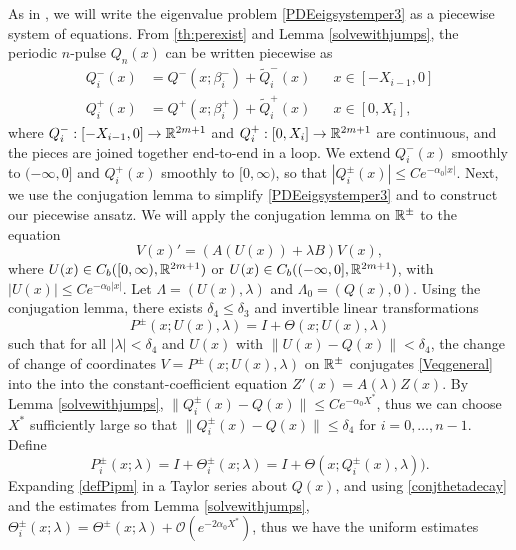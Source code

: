 \documentclass[10pt,reqno]{amsart}
\theoremstyle{plain}
\theoremstyle{definition}
\theoremstyle{remark}
\numberwithin{theorem}{section}
\numberwithin{equation}{section}
\begin{document}
As in \cite{Sandstede1998}, we will write the eigenvalue problem \cref{PDEeigsystemper3} as a piecewise system of equations. From \cref{th:perexist} and Lemma \ref{solvewithjumps}, the periodic $n$-pulse $Q_n(x)$ can be written piecewise as
\begin{equation}\label{Qnppiece}
\begin{aligned}
Q_i^-(x) &= Q^-(x; \beta_i^-) + \tilde{Q}_i^-(x) && x \in [-X_{i-1}, 0] \\
Q_i^+(x) &= Q^+(x; \beta_i^+) + \tilde{Q}_i^+(x) && x \in [0, X_i],
\end{aligned}
\end{equation}
where $Q_i^-: [-X_{i-1}, 0] \rightarrow \mathbb{R}^{2m+1}$ and $Q_i^+: [0, X_i] \rightarrow \mathbb{R}^{2m+1}$ are continuous, and the pieces are joined together end-to-end in a loop. We extend $Q_i^-(x)$ smoothly to $(-\infty, 0]$ and $Q_i^+(x)$ smoothly to $[0, \infty)$, so that $|Q_i^\pm(x)| \leq C e^{-\alpha_0 |x|}$. Next, we use the conjugation lemma to simplify \cref{PDEeigsystemper3} and to construct our piecewise ansatz. We will apply the conjugation lemma on $\mathbb{R}^\pm$ to the equation
\begin{equation}\label{Veqgeneral}
V(x)' = ( A(U(x)) + \lambda B)  V(x),
\end{equation}
where $U(x) \in C_b([0, \infty), \mathbb{R}^{2m+1})$ or $U(x) \in C_b((-\infty, 0], \mathbb{R}^{2m+1})$, with $|U(x)| \leq C e^{-\alpha_0 |x|}$. Let $\Lambda = (U(x), \lambda)$ and $\Lambda_0 = (Q(x), 0)$. Using the conjugation lemma, there exists $\delta_4 \leq \delta_3$ and invertible linear transformations
\[
P^\pm(x; U(x), \lambda) = I + \Theta(x; U(x), \lambda)
\]
such that for all $|\lambda| < \delta_4$ and $U(x)$ with $\| U(x) - Q(x) \| < \delta_4$, the change of change of coordinates $V = P^\pm(x; U(x), \lambda)$ on $\mathbb{R}^\pm$ conjugates \cref{Veqgeneral} into the into the constant-coefficient equation $Z'(x) = A(\lambda) Z(x)$. By Lemma \ref{solvewithjumps}, $\| Q_i^\pm(x) - Q(x) \| \leq C e^{-\alpha_0 X^*}$, thus we can choose $X^*$ sufficiently large so that $\| Q_i^\pm(x) - Q(x) \| \leq \delta_4$ for $i = 0, \dots, n-1$. Define
\begin{equation}\label{defPipm}
P_i^\pm(x; \lambda) = I + \Theta_i^\pm(x; \lambda) = I + \Theta(x; Q_i^\pm(x), \lambda)).
\end{equation}
Expanding \cref{defPipm} in a Taylor series about $Q(x)$, and using \cref{conjthetadecay} and the estimates from Lemma \ref{solvewithjumps}, $\Theta_i^\pm(x; \lambda) = \Theta^\pm(x; \lambda) + \mathcal{O}(e^{-2 \alpha_0 X^*})$, thus we have the uniform estimates
\end{document}
